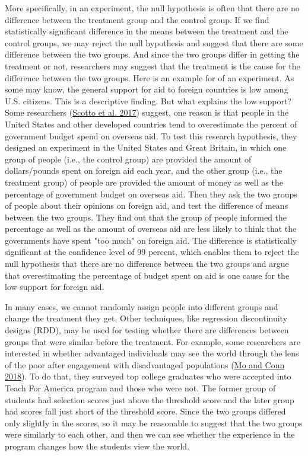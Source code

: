 \documentclass{book}
\begin{document}
More specifically, in an experiment, the null hypothesis is often that there
are no difference between the treatment group and the control group. If we
find statistically significant difference in the means between the treatment
and the control groups, we may reject the null hypothesis and suggest that
there are some difference between the two groups. And since the two groups
differ in getting the treatment or not, researchers may suggest that the
treatment is the cause for the difference between the two groups. Here is an
example for of an experiment. As some may know, the general support for aid to
foreign countries is low among U.S. citizens. This is a descriptive finding.
But what explains the low support? Some researchers
(\protect\hyperlink{ref-scotto_reifler_hudson_vanheerde-hudson_2017}{Scotto et
al. 2017}) suggest, one reason is that people in the United States and other
developed countries tend to overestimate the percent of government budget
spend on overseas aid. To test this research hypothesis, they designed an
experiment in the United States and Great Britain, in which one group of
people (i.e., the control group) are provided the amount of dollars/pounds
spent on foreign aid each year, and the other group (i.e., the treatment
group) of people are provided the amount of money as well as the percentage of
government budget on overseas aid. Then they ask the two groups of people
about their opinions on foreign aid, and test the difference of means between
the two groups. They find out that the group of people informed the percentage
as well as the amount of overseas aid are less likely to think that the
governments have spent "too much" on foreign aid. The difference is
statistically significant at the confidence level of 99 percent, which enables
them to reject the null hypothesis that there are no difference between the
two groups and argue that overestimating the percentage of budget spent on aid
is one cause for the low support for foreign aid.

In many cases, we cannot randomly assign people into different groups and
change the treatment they get. Other techniques, like regression discontinuity
designs (RDD), may be used for testing whether there are differences between
groups that were similar before the treatment. For example, some researchers
are interested in whether advantaged individuals may see the world through the
lens of the poor after engagement with disadvantaged populations
(\protect\hyperlink{ref-mo_conn_2018}{Mo and Conn 2018}). To do that, they
surveyed top college graduates who were accepted into Teach For America
program and those who were not. The former group of students had selection
scores just above the threshold score and the later group had scores fall just
short of the threshold score. Since the two groups differed only slightly in
the scores, so it may be reasonable to suggest that the two groups were
similarly to each other, and then we can see whether the experience in the
program changes how the students view the world.
\end{document}
